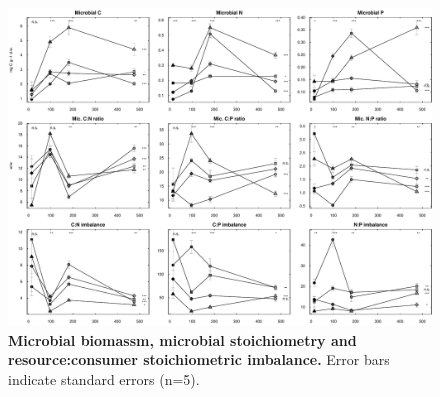 \documentclass[10pt]{article}
\begin{document}
\begin{figure}[!ht]
\begin{center}
\includegraphics{plosone-mb}



\end{center}
\caption{
{\bf Microbial biomassm, microbial stoichiometry and resource:consumer stoichiometric imbalance.} Error bars indicate standard errors (n=5).}
\label{fig:mb}
\end{figure}
\end{document}
